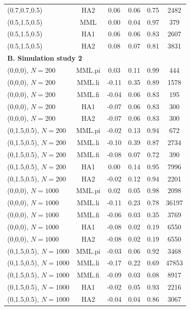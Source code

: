 \documentclass[aoas,preprint]{imsart}
\numberwithin{equation}{section}
\theoremstyle{plain}
\begin{document}
\begin{table}[ht]
\begin{tabular}{lccccc}
  (0.7,0.7,0.5) & HA2 & 0.06 & 0.06 & 0.75 & 2482 \\
  (0.5,1.5,0.5) & MML & 0.00 & 0.04 & 0.97 & 379  \\
  (0.5,1.5,0.5) & HA1 & 0.06 & 0.06 & 0.83 & 2607 \\
  (0.5,1.5,0.5) & HA2 & 0.08 & 0.07 & 0.81 & 3831 \\
  \hline
    \multicolumn{6}{l}{\textbf{B. Simulation study 2}}   \\
  \hline
  (0,0,0), $N=200$ & MML.pi & 0.03 & 0.11 & 0.99 & 444 \\
  (0,0,0), $N=200$ & MML.li & -0.11 & 0.35 & 0.89 & 1578 \\
  (0,0,0), $N=200$ & MML.fi & -0.04 & 0.06 & 0.83 & 195 \\
  (0,0,0), $N=200$ & HA1 & -0.07 & 0.06 & 0.83 & 300 \\
  (0,0,0), $N=200$ & HA2 & -0.07 & 0.06 & 0.83 & 300 \\
  (0,1.5,0.5), $N=200$ & MML.pi & -0.02 & 0.13 & 0.94 & 672  \\
  (0,1.5,0.5), $N=200$ & MML.li & -0.10 & 0.39 & 0.87 & 2734 \\
  (0,1.5,0.5), $N=200$ & MML.fi & -0.08 & 0.07 & 0.72 & 390 \\
  (0,1.5,0.5), $N=200$ & HA1 & 0.00 & 0.14 & 0.95 & 7996 \\
  (0,1.5,0.5), $N=200$ & HA2 & -0.02 & 0.12 & 0.94 & 2201 \\
  (0,0,0), $N=1000$ & MML.pi & 0.02 & 0.05 & 0.98 & 2098 \\
  (0,0,0), $N=1000$ & MML.li & -0.11 & 0.23 & 0.78 & 36197 \\
  (0,0,0), $N=1000$ & MML.fi & -0.06 & 0.03 & 0.35 & 3769 \\
  (0,0,0), $N=1000$ & HA1 & -0.08 & 0.02 & 0.19 & 6550 \\
  (0,0,0), $N=1000$ & HA2 & -0.08 & 0.02 & 0.19 & 6550 \\
  (0,1.5,0.5), $N=1000$ & MML.pi & -0.03 & 0.06 & 0.92 & 3468 \\
  (0,1.5,0.5), $N=1000$ & MML.li & -0.17 & 0.22 & 0.69 & 47853  \\
  (0,1.5,0.5), $N=1000$ & MML.fi & -0.09 & 0.03 & 0.08 & 8917  \\
  (0,1.5,0.5), $N=1000$ & HA1 & -0.02 & 0.05 & 0.93 & 2216 \\
  (0,1.5,0.5), $N=1000$ & HA2 & -0.04 & 0.04 & 0.86 & 3067 \\
\hline
\end{tabular}
\end{table}
\end{document}
